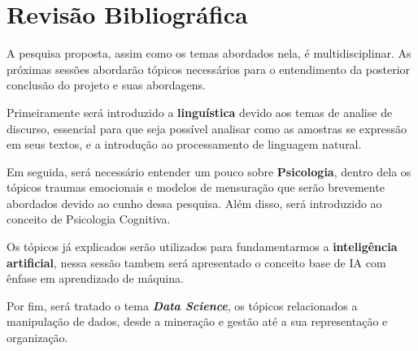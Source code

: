 \chapter{Revisão Bibliográfica}
A pesquisa proposta, assim como os temas abordados nela, é multidisciplinar. As próximas sessões abordarão tópicos necessários para o entendimento da posterior conclusão do projeto e suas abordagens.

Primeiramente será introduzido a \textbf{linguística} devido aos temas de analise de discurso, essencial para que seja possível analisar como as amostras se expressão em seus textos, e a introdução ao processamento de linguagem natural.

Em seguida, será necessário entender um pouco sobre \textbf{Psicologia}, dentro dela os tópicos traumas emocionais e modelos de mensuração que serão brevemente abordados devido ao cunho dessa pesquisa. Além disso, será introduzido ao conceito de Psicologia Cognitiva.

Os tópicos já explicados serão utilizados para fundamentarmos a \textbf{inteligência artificial}, nessa sessão tambem será apresentado o conceito base de IA com ênfase em aprendizado de máquina.

Por fim, será tratado o tema \textit{\textbf{Data Science}}, os tópicos relacionados a manipulação de dados, desde a mineração e gestão até a sua representação e organização.





